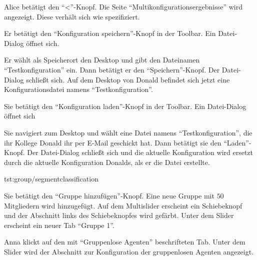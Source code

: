 \documentclass[parskip=full,11pt]{scrartcl}
\begin{document}
{Alice betätigt den \enquote{<}-Knopf.}
{Die Seite \enquote{Multikonfigurationsergebnisse} wird angezeigt. Diese verhält sich wie spezifiziert.}


{Er betätigt den \enquote{Konfiguration speichern}-Knopf in der Toolbar.}
{Ein Datei-Dialog öffnet sich.}

{Er wählt als Speicherort den Desktop und gibt den Dateinamen \enquote{Testkonfiguration} ein. Dann betätigt er den \enquote{Speichern}-Knopf.}
{Der Datei-Dialog schließt sich. Auf dem Desktop von Donald befindet sich jetzt eine Konfigurationsdatei namens \enquote{Testkonfiguration}.}

{Sie betätigt den \enquote{Konfiguration laden}-Knopf in der Toolbar.}
{Ein Datei-Dialog öffnet sich}

{Sie navigiert zum Desktop und wählt eine Datei namens \enquote{Testkonfiguration}, die ihr Kollege Donald ihr per E-Mail geschickt hat. Dann betätigt sie den \enquote{Laden}-Knopf.}
{Der Datei-Dialog schließt sich und die aktuelle Konfiguration wird ersetzt durch die aktuelle Konfiguration Donalds, als er die Datei erstellte.}

{tst:group/segmentclassification}

{Sie betätigt den \enquote{Gruppe hinzufügen}-Knopf.}
{Eine neue Gruppe mit \(50\) Mitgliedern wird hinzugefügt. Auf dem \Gls{Multislider} erscheint ein Schiebeknopf und der Abschnitt links des Schiebeknopfes wird gefärbt. Unter dem Slider erscheint ein neuer Tab \enquote{Gruppe 1}.}

{Anna klickt auf den mit \enquote{Gruppenlose Agenten} beschrifteten Tab.}
{Unter dem Slider wird der Abschnitt zur Konfiguration der gruppenlosen Agenten angezeigt.}
\end{document}
